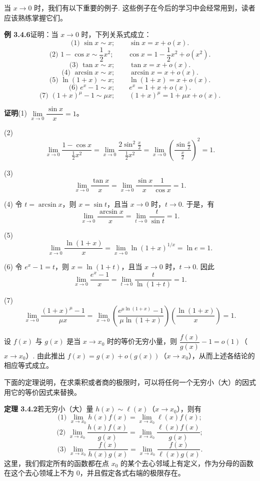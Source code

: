 \documentclass[UTF8, 12pt, fontset=fandol, oneside]{ctexart}
\begin{document}
当 $x\to0$ 时，我们有以下重要的例子. 这些例子在今后的学习中会经常用到，读者应该熟练掌握它们。

\noindent\textbf{例 3.4.6}\quad 证明：当 $x\to0$ 时，下列关系式成立：
\[
  \text{(1) }\sin x\sim x;\qquad \sin x=x+o(x).
\]
\[
  \text{(2) }1-\cos x\sim\frac12x^2;\qquad
  \cos x=1-\frac12x^2+o(x^2).
\]
\[
  \text{(3) }\tan x\sim x;\qquad \tan x=x+o(x).
\]
\[
  \text{(4) }\arcsin x\sim x;\qquad \arcsin x=x+o(x).
\]
\[
  \text{(5) }\ln(1+x)\sim x;\qquad \ln(1+x)=x+o(x).
\]
\[
  \text{(6) }e^x-1\sim x;\qquad e^x=1+x+o(x).
\]
\[
  \text{(7) }(1+x)^\mu-1\sim\mu x;\qquad
  (1+x)^\mu=1+\mu x+o(x).
\]

\noindent\textbf{证明}\quad (1) $\lim\limits_{x\to0}\dfrac{\sin x}{x}=1$。

(2)
\[
  \lim_{x\to0}\frac{1-\cos x}{\frac12x^2}
  =
  \lim_{x\to0}\frac{2\sin^2\frac x2}{\frac12x^2}
  =
  \lim_{x\to0}\left(\frac{\sin\frac x2}{\frac x2}\right)^2
  =
  1.
\]

(3)
\[
  \lim_{x\to0}\frac{\tan x}{x}
  =
  \lim_{x\to0}\frac{\sin x}{x}\frac1{\cos x}
  =
  1.
\]

(4) 令 $t=\arcsin x$，则 $x=\sin t$，且当 $x\to0$ 时，$t\to0$. 于是，有
\[
  \lim_{x\to0}\frac{\arcsin x}{x}
  =
  \lim_{t\to0}\frac t{\sin t}
  =
  1.
\]

(5)
\[
  \lim_{x\to0}\frac{\ln(1+x)}x
  =
  \lim_{x\to0}\ln(1+x)^{1/x}
  =
  \ln e
  =
  1.
\]

(6) 令 $e^x-1=t$，则 $x=\ln(1+t)$，且当 $x\to0$ 时，$t\to0$. 因此
\[
  \lim_{x\to0}\frac{e^x-1}{x}
  =
  \lim_{t\to0}\frac t{\ln(1+t)}
  =
  1.
\]

(7)
\[
  \lim_{x\to0}\frac{(1+x)^\mu-1}{\mu x}
  =
  \lim_{x\to0}
  \left(\frac{e^{\mu\ln(1+x)}-1}{\mu\ln(1+x)}\right)
  \left(\frac{\ln(1+x)}x\right)
  =
  1.
\]

设 $f(x)$ 与 $g(x)$ 是当 $x\to x_0$ 时的等价无穷小量，则 $\dfrac{f(x)}{g(x)}-1=o(1)$（$x\to x_0$）. 由此推出 $f(x)=g(x)+o(g(x))$（$x\to x_0$），从而上述各结论的相应等式成立。

下面的定理说明，在求乘积或者商的极限时，可以将任何一个无穷小（大）的因式用它的等价因式来替换。

\noindent\textbf{定理 3.4.2}\quad 若无穷小（大）量 $h(x)\sim \ell(x)$（$x\to x_0$），则有
\[
  \text{(1) }\lim_{x\to x_0}h(x)f(x)=\lim_{x\to x_0}\ell(x)f(x);
\]
\[
  \text{(2) }\lim_{x\to x_0}\frac{h(x)f(x)}{g(x)}
  =
  \lim_{x\to x_0}\frac{\ell(x)f(x)}{g(x)};
\]
\[
  \text{(3) }\lim_{x\to x_0}\frac{f(x)}{h(x)g(x)}
  =
  \lim_{x\to x_0}\frac{f(x)}{\ell(x)g(x)}.
\]
这里，我们假定所有的函数都在点 $x_0$ 的某个去心邻域上有定义，作为分母的函数在这个去心领域上不为 $0$，并且假定各式右端的极限存在。
\end{document}

